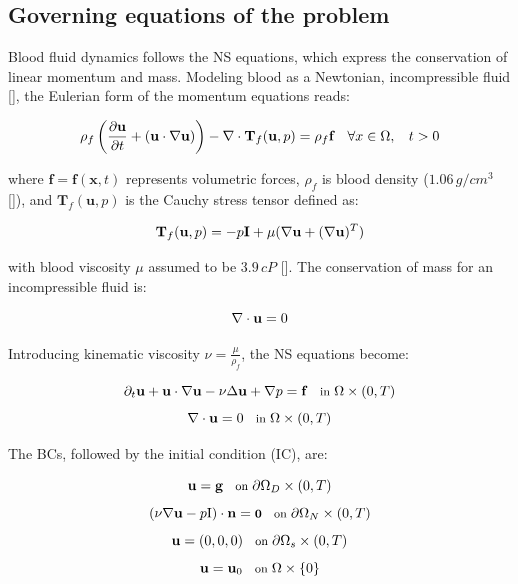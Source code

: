 \subsection*{Governing equations of the problem}
Blood fluid dynamics follows the NS equations, which express the conservation of linear momentum and mass. Modeling blood as a Newtonian, incompressible fluid [\cite{Khalid2021}], the Eulerian form of the momentum equations reads:

\begin{equation}
\label{eq:1}
\small
\rho_f \left( \frac{\partial \mathbf{u}}{\partial t} + (\mathbf{u} \cdot \nabla \mathbf{u}) \right) - \nabla \cdot \mathbf{T}_f(\mathbf{u}, p) = \rho_f \mathbf{f} \quad \forall x \in \Omega, \quad t > 0
\end{equation}

where \(\mathbf{f} = \mathbf{f}(\mathbf{x},t)\) represents volumetric forces, \(\rho_f\) is blood density ($1.06 \, g/cm^3$ [\cite{Timothy2016}]), and \(\mathbf{T}_f(\mathbf{u}, p)\) is the Cauchy stress tensor defined as:


\begin{equation}
\label{eq:2}
\small
\mathbf{T}_f(\mathbf{u}, p) = -p\mathbf{I} + \mu(\nabla \mathbf{u} + (\nabla \mathbf{u})^T)
\end{equation}

with blood viscosity \(\mu\) assumed to be $3.9 \, cP$ [\cite{Khnouf2019}]. The conservation of mass for an incompressible fluid is:

\begin{equation}
\label{eq:3}
\small
\nabla \cdot \mathbf{u} = 0
\end{equation}

Introducing kinematic viscosity \(\nu = \frac{\mu}{\rho_f}\), the NS equations become:

\begin{equation}
\label{eq:4}
\small
\partial_t \mathbf{u} + \mathbf{u} \cdot \nabla \mathbf{u} - \nu \Delta \mathbf{u} + \nabla p = \mathbf{f} \quad \text{in } \Omega \times (0, T)
\end{equation}
\begin{equation}
\label{eq:5}
\small
\nabla \cdot \mathbf{u} = 0 \quad \text{in } \Omega \times (0, T)
\end{equation}

The BCs, followed by the initial condition (IC), are:

\begin{equation}
\label{eq:6}
\small
\mathbf{u} = \mathbf{g} \quad \text{on } \partial \Omega_D \times (0, T)
\end{equation}
\begin{equation}
\label{eq:7}
\small
(\nu \nabla \mathbf{u} - p \mathrm{I}) \cdot \mathbf{n} = \textbf{0} \quad \text{on } \partial \Omega_N \times (0, T)
\end{equation}
\begin{equation}
\label{eq:8}
\small
\mathbf{u} = (0,0,0) \quad \text{on } \partial \Omega_s \times (0, T)
\end{equation}
\begin{equation}
\label{eq:9}
\small
\mathbf{u} = \mathbf{u}_0 \quad \text{on } \Omega \times \{0\}
\end{equation}

